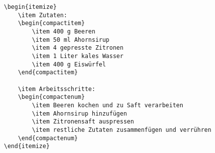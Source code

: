 \begin{verbatim}
\begin{itemize}
	\item Zutaten:
	\begin{compactitem}
		\item 400 g Beeren
		\item 50 ml Ahornsirup 
		\item 4 gepresste Zitronen
		\item 1 Liter kales Wasser
		\item 400 g Eiswürfel
	\end{compactitem}

	\item Arbeitsschritte:
	\begin{compactenum}
		\item Beeren kochen und zu Saft verarbeiten
		\item Ahornsirup hinzufügen
		\item Zitronensaft auspressen
		\item restliche Zutaten zusammenfügen und verrühren
	\end{compactenum}
\end{itemize}
\end{verbatim}
